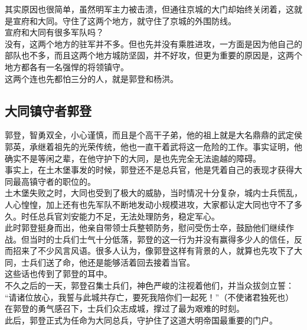 \begin{multicols}{\theparacolNo}
其实原因也很简单，虽然明军主力被击溃，但通往京城的大门却始终关闭着，这就是宣府和大同。守住了这两个地方，就守住了京城的外围防线。\\

宣府和大同有很多军队吗？\\

没有，这两个地方的驻军并不多。但也先并没有乘胜进攻，一方面是因为他自己的部队也不多，而且这两个地方城防坚固，并不好攻，但更为重要的原因是，这两个地方都各有一名强悍的将领镇守。\\

这两个连也先都怕三分的人，就是郭登和杨洪。\\

\subsection{大同镇守者郭登}
郭登，智勇双全，小心谨慎，而且是个高干子弟，他的祖上就是大名鼎鼎的武定侯郭英，承继着祖先的光荣传统，他也一直干着武将这一危险的工作。事实证明，他确实不是等闲之辈，在他守护下的大同，是也先完全无法逾越的障碍。\\

事实上，在土木堡事发的时候，郭登还不是总兵官，他是凭着自己的表现才获得大同最高镇守者的职位的。\\

土木堡失败之时，大同也受到了极大的威胁，当时情况十分复杂，城内士兵慌乱，人心惶惶，加上还有也先军队不断地发动小规模进攻，大家都认定大同也守不了多久。时任总兵官刘安能力不足，无法处理防务，稳定军心。\\

此时郭登挺身而出，他亲自带领士兵整顿防务，慰问受伤士卒，鼓励他们继续作战。但当时的士兵们士气十分低落，郭登的这一行为并没有赢得多少人的信任，反而招来了不少风言风语。很多人认为，像郭登这样有背景的人，就算也先攻下了大同，士兵们送了命，他还是能够活着回去接着当官。\\

这些话也传到了郭登的耳中。\\

不久之后的一天，郭登召集士兵们，神色严峻的注视着他们，并当众拔剑立誓：\\

“请诸位放心，我誓与此城共存亡，要死我陪你们一起死！”（不使诸君独死也）\\

在郭登的勇气感召下，士兵们众志成城，撑过了最为艰难的时刻。\\

此后，郭登正式为任命为大同总兵，守护住了这道大明帝国最重要的门户。\\


\end{multicols}
